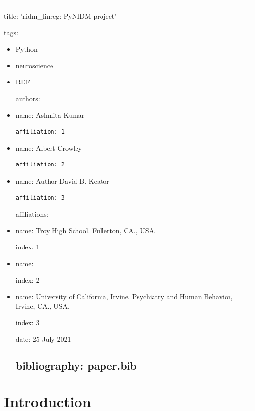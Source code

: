 \begin{center}\rule{3in}{0.4pt}\end{center}

title: 'nidm\_linreg: PyNIDM project'

tags:

\begin{itemize}
\itemsep1pt\parskip0pt
\item
  Python
\item
  neuroscience
\item
  RDF

  authors:
\item
  name: Ashmita Kumar

\begin{verbatim}
affiliation: 1
\end{verbatim}
\item
  name: Albert Crowley

\begin{verbatim}
affiliation: 2
\end{verbatim}
\item
  name: Author David B. Keator

\begin{verbatim}
affiliation: 3
\end{verbatim}

  affiliations:
\item
  name: Troy High School. Fullerton, CA., USA.

  index: 1
\item
  name:

  index: 2
\item
  name: University of California, Irvine. Psychiatry and Human Behavior,
  Irvine, CA., USA.

  index: 3

  date: 25 July 2021

  \subsection{bibliography: paper.bib}
\end{itemize}

\section{Introduction}


